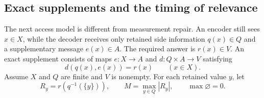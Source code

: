 \subsection{Exact supplements and the timing of relevance}
\label{sec:supplement-coding}

The next access model is different from measurement repair. An encoder
still sees $x\in X$, while the decoder receives only retained side
information $q(x)\in Q$ and a supplementary message $e(x)\in A$.
The required answer is $r(x)\in V$. An exact supplement consists of
maps $e:X\to A$ and $d:Q\times A\to V$ satisfying
\[
 d(q(x),e(x))=r(x)\qquad(x\in X).
\]
Assume $X$ and $Q$ are finite and $V$ is nonempty. For each retained
value $y$, let
\[
 R_y=r(q^{-1}(\{y\})),\qquad
 M=\max_{y\in Q}|R_y|,
 \qquad \max\varnothing=0.
\]

